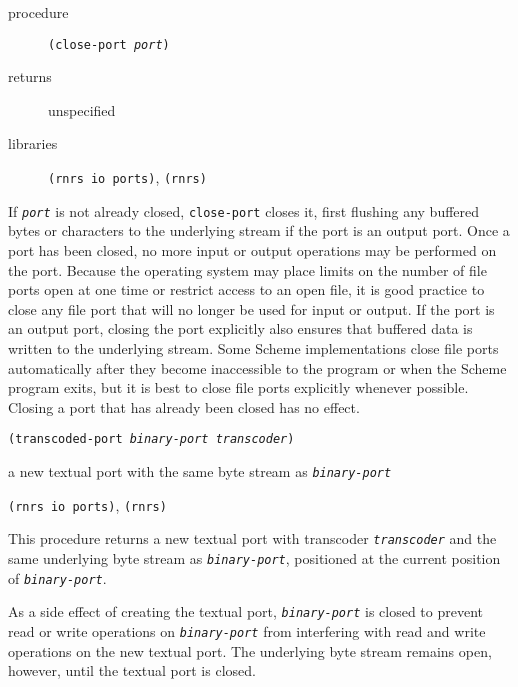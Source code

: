 \begin{description}

\label{io_s46}\item[procedure] \texttt{(close-port \textit{port})}



\item[returns] unspecified


\item[libraries] \texttt{(rnrs io ports)}, \texttt{(rnrs)}
\end{description}


If \texttt{\textit{port}} is not already closed, \texttt{close-port} closes it,
first flushing any buffered bytes or characters to the underlying stream
if the port is an output port.
Once a port has been closed, no more input or output operations may be
performed on the port.
Because the operating system may place limits on the number of file ports open
at one time or restrict access to an open file, it is good practice to
close any file port that will no longer be used for input or output.
If the port is an output port, closing the port explicitly also ensures
that buffered data is written to the underlying stream.
Some Scheme implementations close file ports automatically after they become
inaccessible to the program or when the Scheme program exits, but it is
best to close file ports explicitly whenever possible.
Closing a port that has already been closed has no effect.


\begin{description}

\label{io_s47}\item[procedure] \texttt{(transcoded-port \textit{binary-port} \textit{transcoder})}



\item[returns] a new textual port with the same byte stream as \texttt{\textit{binary-port}}


\item[libraries] \texttt{(rnrs io ports)}, \texttt{(rnrs)}
\end{description}


This procedure returns a new textual port with transcoder \texttt{\textit{transcoder}}
and the same underlying byte stream as \texttt{\textit{binary-port}}, positioned at
the current position of \texttt{\textit{binary-port}}.


As a side effect of creating the textual port, \texttt{\textit{binary-port}} is closed
to prevent read or write operations on \texttt{\textit{binary-port}} from interfering
with read and write operations on the new textual port.
The underlying byte stream remains open, however, until the textual port
is closed.


